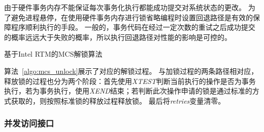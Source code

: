 由于硬件事务内存不能保证每次事务化执行都能成功提交对系统状态的更改。
为了避免进程悬停，在使用硬件事务内存进行锁省略编程时设置回退路径是有效的保障程序顺利执行的手段。
一般的，事务代码在经过一定次数的重试之后成功提交的概率远远大于失败的概率，所以执行回退路径对性能的影响是可控的。

\begin{algorithm}[htbp]
\SetAlgoLined
{}

\caption{基于Intel RTM的MCS解锁算法}
\label{algo:mcs_unlock}
\end{algorithm}

算法~\ref{algo:mcs_unlock}展示了对应的解锁过程。
与加锁过程的两条路径相对应，释放锁的过程也分为两个阶段：首先使用\textit{XTEST}判断当前执行的操作是否为事务执行，若为事务执行，使用\textit{XEND}结束；若判断此次操作申请的锁是通过标准的方式获取的，则按照标准锁的释放过程释放锁。
最后将\textit{retries}变量清零。

\subsubsection{并发访问接口}

